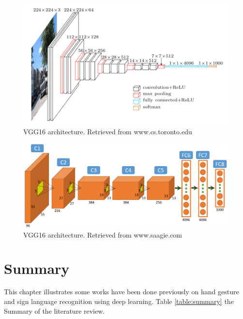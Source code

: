 \documentclass[12pt]{report}
\begin{document}
                    \begin{figure}[h]
                        \centering
                        \includegraphics[width=\textwidth]{images/vgg16.png}
                        \caption{VGG16 architecture. Retrieved from www.cs.toronto.edu}
                        \label{fig:vgg16}
                    \end{figure}
                    \begin{figure}[h]
                        \centering
                        \includegraphics[width=\textwidth]{images/alexnet.png}
                        \caption{VGG16 architecture. Retrieved from www.saagie.com}
                        \label{fig:alexnet}
                    \end{figure}

                \newpage

            \section{Summary}
                \paragraph{}
                    This chapter illustrates some works have been done previously on
                    hand gesture and sign language recognition using deep learning.
                    Table \ref{table:summary} the Summary of the literature review.
                    
\end{document}
